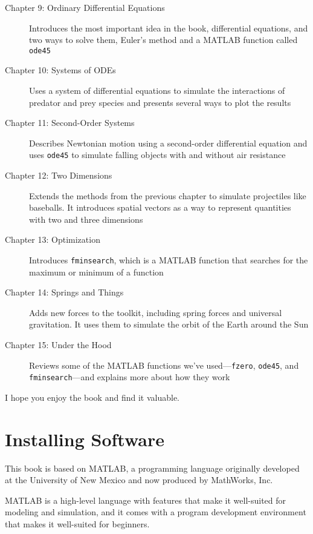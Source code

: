 \begin{description}
\item [Chapter 9: Ordinary Differential Equations] Introduces the most important idea in the book, differential equations, and two ways to solve them, Euler's method and a MATLAB function called \lstinline{ode45}

\item [Chapter 10: Systems of ODEs] Uses a system of differential equations to simulate the interactions of predator and prey species and presents several ways to plot the results

\item [Chapter 11: Second-Order Systems] Describes Newtonian motion using a second-order differential equation and uses \lstinline{ode45} to simulate falling objects with and without air resistance

\item [Chapter 12: Two Dimensions] Extends the methods from the previous chapter to simulate projectiles like baseballs.  It introduces spatial vectors as a way to represent quantities with two and three dimensions

\item [Chapter 13: Optimization] Introduces \lstinline{fminsearch}, which is a MATLAB function that searches for the maximum or minimum of a function

\item [Chapter 14: Springs and Things] Adds new forces to the toolkit, including spring forces and universal gravitation.  It uses them to simulate the orbit of the Earth around the Sun

\item [Chapter 15: Under the Hood] Reviews some of the MATLAB functions we've used---\lstinline{fzero}, \lstinline{ode45}, and \lstinline{fminsearch}---and explains more about how they work

\end{description}

I hope you enjoy the book and find it valuable.


\section*{Installing Software}

This book is based on MATLAB, a programming language originally \linebreak developed at the University of New Mexico and now produced by MathWorks, Inc.

MATLAB is a high-level language with features that make it well-suited for modeling and simulation, and it comes with a program development environment that makes it well-suited for beginners.

